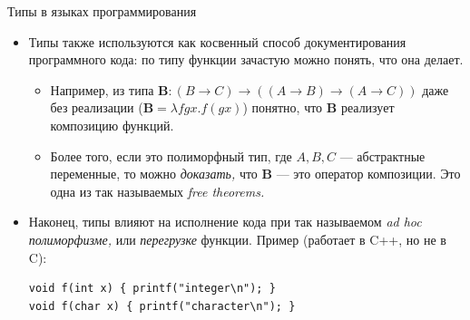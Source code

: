 \documentclass[xcolor=dvipsnames]{beamer}
\newcommand{\Bx}{\mathbf{B}}
\begin{document}
\begin{frame}[fragile]{Типы в языках программирования}
 \begin{itemize}[<+->]
  \item Типы также используются как косвенный способ документирования программного кода: по типу функции зачастую можно понять, что она делает.
  \begin{itemize}
    \item Например, из типа $\Bx :
    (B \to C) \to ((A \to B) \to (A \to C))$ даже без реализации ($\Bx = \lambda f g x . f (g x)$) понятно, что $\Bx$ реализует композицию функций.
    \item Более того, если это полиморфный тип, где $A,B,C$ --- абстрактные переменные, то можно {\em доказать,} что $\Bx$ --- это оператор композиции. Это одна из так называемых {\em free theorems.}
  \end{itemize}
  \item Наконец, типы влияют на исполнение кода при так называемом {\em ad hoc полиморфизме,} или {\em перегрузке} функции. Пример (работает в C++, но не в C):
  \begin{verbatim}
void f(int x) { printf("integer\n"); }
void f(char x) { printf("character\n"); }
  \end{verbatim}
 \end{itemize}

 
\end{frame}
\end{document}
